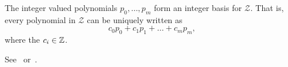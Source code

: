 \documentclass[journal]{IEEEtran}
\begin{document}
\begin{lemma}\label{lem:intvalpol}
  The integer valued polynomials $p_0,\dots,p_m$ form an integer basis for $\mathcal{Z}$.  That is, every polynomial in $\mathcal{Z}$ can be uniquely written as
\begin{equation} \label{eq:lem_polynomial}
c_0 p_0 + c_1 p_1 + \dots + c_m p_m,
\end{equation}
where the $c_i \in {\mathbb Z}$.
\end{lemma}
\begin{IEEEproof}
See~\citep[p. 2]{cahen_integer-valued_1997} or~\cite{McKilliam2009IndentifiabliltyAliasingPolyphase}. 
\end{IEEEproof}
\end{document}

